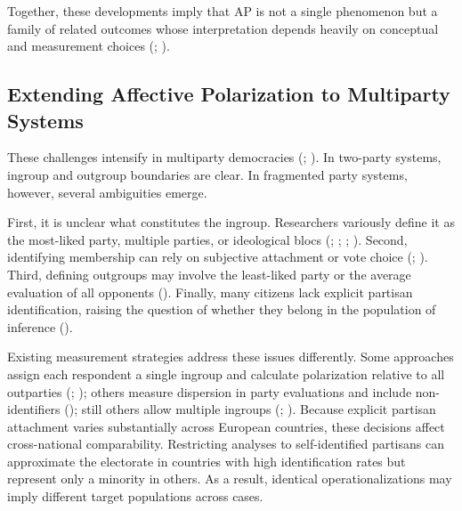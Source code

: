 \documentclass[
  12pt,
  a4paper,
  DIV=11,
  numbers=noendperiod]{scrartcl}
\begin{document}
Together, these developments imply that AP is not a single phenomenon
but a family of related outcomes whose interpretation depends heavily on
conceptual and measurement choices (;
).

\subsection{Extending Affective Polarization to Multiparty
Systems}\label{sec-extending-AP}

These challenges intensify in multiparty democracies
(;
). In two-party systems, ingroup and outgroup boundaries
are clear. In fragmented party systems, however, several ambiguities
emerge.

First, it is unclear what constitutes the ingroup. Researchers variously
define it as the most-liked party, multiple parties, or ideological
blocs (; ;
;
). Second,
identifying membership can rely on subjective attachment or vote choice
(;
). Third, defining outgroups
may involve the least-liked party or the average evaluation of all
opponents (). Finally,
many citizens lack explicit partisan identification, raising the
question of whether they belong in the population of inference
().

Existing measurement strategies address these issues differently. Some
approaches assign each respondent a single ingroup and calculate
polarization relative to all outparties
(;
); others
measure dispersion in party evaluations and include non-identifiers
(); still others allow
multiple ingroups (; ). Because explicit partisan attachment varies substantially across
European countries, these decisions affect cross-national comparability.
Restricting analyses to self-identified partisans can approximate the
electorate in countries with high identification rates but represent
only a minority in others. As a result, identical operationalizations
may imply different target populations across cases.
\end{document}
